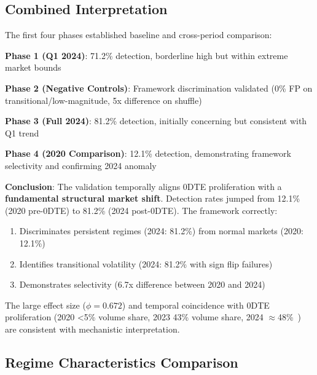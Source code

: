 \subsection{Combined Interpretation}

\vspace{0.2cm}

The first four phases established baseline and cross-period comparison:

\vspace{0.2cm}

\noindent\textbf{Phase 1 (Q1 2024)}: 71.2\% detection, borderline high but within extreme market bounds

\vspace{0.1cm}

\noindent\textbf{Phase 2 (Negative Controls)}: Framework discrimination validated (0\% FP on transitional/low-magnitude, 5x difference on shuffle)

\vspace{0.1cm}

\noindent\textbf{Phase 3 (Full 2024)}: 81.2\% detection, initially concerning but consistent with Q1 trend

\vspace{0.1cm}

\noindent\textbf{Phase 4 (2020 Comparison)}: 12.1\% detection, demonstrating framework selectivity and confirming 2024 anomaly

\vspace{0.1cm}

\noindent\textbf{Conclusion}: The validation temporally aligns 0DTE proliferation with a \textbf{fundamental structural market shift}. Detection rates jumped from 12.1\% (2020 pre-0DTE) to 81.2\% (2024 post-0DTE). The framework correctly:
\begin{enumerate}
\item Discriminates persistent regimes (2024: 81.2\%) from normal markets (2020: 12.1\%)
\item Identifies transitional volatility (2024: 81.2\% with sign flip failures)
\item Demonstrates selectivity (6.7x difference between 2020 and 2024)
\end{enumerate}

The large effect size ($\phi = 0.672$) and temporal coincidence with 0DTE proliferation (2020 <5\% volume share, 2023 43\% volume share, 2024 $\approx$48\%~\cite{cboe2024zero}) are consistent with mechanistic interpretation.

\subsection{Regime Characteristics Comparison}

